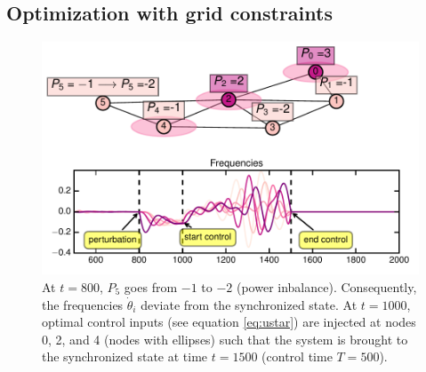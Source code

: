 \documentclass[conference]{IEEEtran}
\begin{document}

\subsection{Optimization with grid constraints}

\begin{figure}
\includegraphics[scale=.55]{plot5.pdf}%
\caption{At $ t=800 $, $P_5 $ goes from $-1$ to $-2$ (power inbalance). Consequently, the frequencies $ \dot{ \theta }_i $ deviate from the synchronized state. At $ t = 1000$, optimal control inputs (see equation \ref{eq:ustar}) are injected at nodes 0, 2, and 4 (nodes with ellipses) such that the system is brought to the synchronized state at time $ t = 1500 $ (control time $ T = 500 $).} 


\label{fig:frequecies}
\end{figure}
\end{document}
